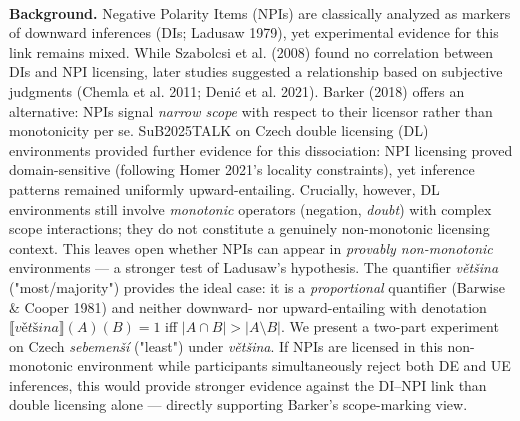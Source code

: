 \documentclass[12pt, a4]{article}
\begin{document}


\begin{center}{\vspace{-2ex}{\bf  TITLE}}\\
\end{center}
\vspace{-1ex}
\cite{barker2018negative} \noindent \textbf{Background.} Negative Polarity Items (NPIs) are classically analyzed as markers of downward inferences (DIs; Ladusaw 1979), yet experimental evidence for this link remains mixed. While Szabolcsi et al. (2008) found no correlation between DIs and NPI licensing, later studies suggested a relationship based on subjective judgments (Chemla et al. 2011; Denić et al. 2021). Barker (2018) offers an alternative: NPIs signal \textit{narrow scope} with respect to their licensor rather than monotonicity per se. SuB2025TALK on Czech double licensing (DL) environments provided further evidence for this dissociation: NPI licensing proved domain-sensitive (following Homer 2021's locality constraints), yet inference patterns remained uniformly upward-entailing. Crucially, however, DL environments still involve \textit{monotonic} operators (negation, \textit{doubt}) with complex scope interactions; they do not constitute a genuinely non-monotonic licensing context. This leaves open whether NPIs can appear in \textit{provably non-monotonic} environments — a stronger test of Ladusaw's hypothesis. The quantifier \textit{většina} ("most/majority") provides the ideal case: it is a \textit{proportional} quantifier (Barwise \& Cooper 1981) and neither downward- nor upward-entailing with denotation $\llbracket\textit{většina}\rrbracket(A)(B)=1$ iff $|A\cap B|>|A\setminus B|$. We present a two-part experiment on Czech \textit{sebemenší} ("least") under \textit{většina}. If NPIs are licensed in this non-monotonic environment while participants simultaneously reject both DE and UE inferences, this would provide stronger evidence against the DI–NPI link than double licensing alone — directly supporting Barker's scope-marking view.
\end{document}
